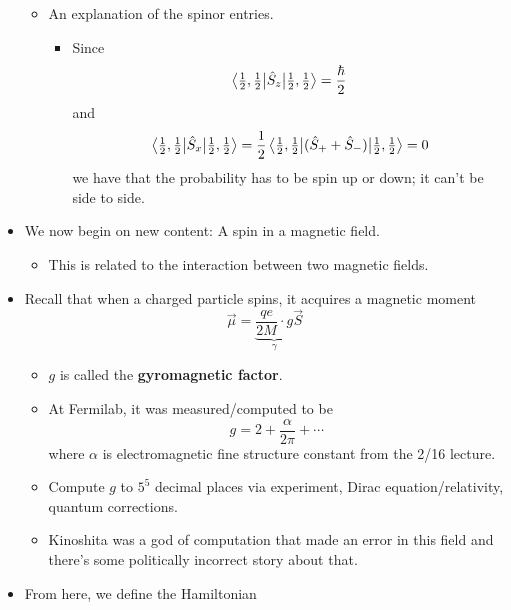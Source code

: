 \documentclass[../notes.tex]{subfiles}
\begin{document}
\begin{itemize}
\begin{itemize}
        \item An explanation of the spinor entries.
        \begin{itemize}
            \item Since
            \begin{equation*}
                \ev{\hat{S}_z}{\tfrac{1}{2},\tfrac{1}{2}} = \frac{\hbar}{2}
            \end{equation*}
            and
            \begin{equation*}
                \ev{\hat{S}_x}{\tfrac{1}{2},\tfrac{1}{2}} = \frac{1}{2}\ev{(\hat{S}_++\hat{S}_-)}{\tfrac{1}{2},\tfrac{1}{2}}
                = 0
            \end{equation*}
            we have that the probability has to be spin up or down; it can't be side to side.
        \end{itemize}
    \end{itemize}
    \item We now begin on new content: A spin in a magnetic field.
    \begin{itemize}
        \item This is related to the interaction between two magnetic fields.
    \end{itemize}
    \item Recall that when a charged particle spins, it acquires a magnetic moment
    \begin{equation*}
        \vec{\mu} = \underbrace{\frac{qe}{2M}\cdot g}_\gamma\vec{S}
    \end{equation*}
    \begin{itemize}
        \item $g$ is called the \textbf{gyromagnetic factor}.
        \item At Fermilab, it was measured/computed to be
        \begin{equation*}
            g = 2+\frac{\alpha}{2\pi}+\cdots
        \end{equation*}
        where $\alpha$ is electromagnetic fine structure constant from the 2/16 lecture.
        \item Compute $g$ to $5^5$ decimal places via experiment, Dirac equation/relativity, quantum corrections.
        \item Kinoshita was a god of computation that made an error in this field and there's some politically incorrect story about that.
    \end{itemize}
    \item From here, we define the Hamiltonian

\end{itemize}
\end{document}
